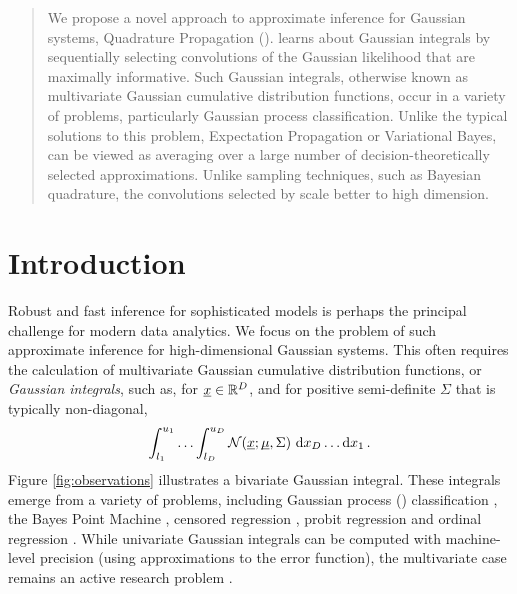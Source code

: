 \documentclass[twoside]{article}
\begin{document}

\begin{abstract}%
We propose a novel approach to approximate inference for Gaussian systems, Quadrature Propagation (\qp). \qp learns about Gaussian integrals by sequentially selecting convolutions of the Gaussian likelihood that are maximally informative. Such Gaussian integrals, otherwise known as multivariate Gaussian cumulative distribution functions, occur in a variety of problems, particularly Gaussian process classification. Unlike the typical solutions to this problem, Expectation Propagation or Variational Bayes, \qp can be viewed as averaging over a large number of decision-theoretically selected approximations. Unlike sampling techniques, such as Bayesian quadrature, the convolutions selected by \qp scale better to high dimension. 
\end{abstract}


\section{Introduction}

Robust and fast inference for sophisticated models is perhaps the principal challenge for modern data analytics. We focus on the problem of such approximate inference for high-dimensional Gaussian systems. This often requires the calculation of multivariate Gaussian cumulative distribution functions, or \emph{Gaussian integrals}, such as, for $\underline{\smash{x}}\in\mathbb{R}^D$, and for positive semi-definite $\Sigma$ that is typically non-diagonal,
\begin{align}\label{eq:GI}
\int_{l_1}^{u_1}\ldots\int_{l_D}^{u_D} \mathcal{N}(\underline{\smash{x}};\underline{\smash{\mu}},\Sigma)~\mathrm{d} x_D \ldots \mathrm{d} x_1\,.
\end{align}
Figure \ref{fig:observations} illustrates a bivariate Gaussian integral. These integrals emerge from a variety of problems, including Gaussian process (\gp) classification \citep{GpsBook}, the Bayes Point Machine \citep{herbrich2001bayes}, censored regression \citep{ertin2007gaussian}, probit regression \citep{ochi1984likelihood} and ordinal regression \citep{chu2005gaussian}. While univariate Gaussian integrals can be computed with machine-level precision (using approximations to the error function), the multivariate case remains an active research problem \citep{cunningham2011approximate}. 
\end{document}
